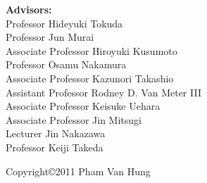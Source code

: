 \begin{center}
\textbf{{\Large Advisors:}}\\
\vspace{5mm}
{\Large Professor Hideyuki Tokuda}\\
\vspace{2mm}
{\Large Professor Jun Murai}\\
\vspace{2mm}
{\Large Associate Professor Hiroyuki Kusumoto}\\
\vspace{2mm}
{\Large Professor Osamu Nakamura}\\
\vspace{2mm}
{\Large Associate Professor Kazunori Takashio}\\
\vspace{2mm}
{\Large Assistant Professor Rodney D. Van Meter III}\\
\vspace{2mm}
{\Large Associate Professor Keisuke Uehara}\\
\vspace{2mm}
{\Large Associate Professor Jin Mitsugi}\\
\vspace{2mm}
{\Large Lecturer Jin Nakazawa}\\
\vspace{2mm}
{\Large Professor Keiji Takeda}\\

\vspace{10mm}

{\large Copyright\copyright  2011 Pham Van Hung}

\end{center}

